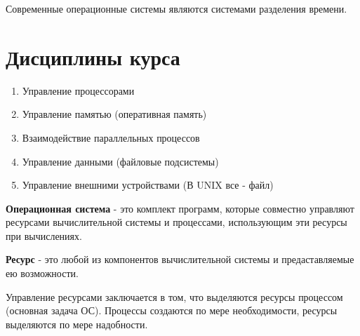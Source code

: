 \documentclass[a4paper, 14pt]{report}
\begin{document}
    Современные операционные системы являются системами разделения времени.

    \section{Дисциплины курса}

    \begin{enumerate}
        \item Управление процессорами
        \item Управление памятью (оперативная память)
        \item Взаимодействие параллельных процессов
        \item Управление данными (файловые подсистемы)
        \item Управление внешними устройствами (В UNIX все - файл)
    \end{enumerate}

    \textbf{Операционная система} - это комплект программ, которые совместно управляют ресурсами вычислительной системы и процессами, использующим эти ресурсы при вычислениях.

    \textbf{Ресурс} - это любой из компонентов вычислительной системы и предаставляемые ею возможности.

    Управление ресурсами заключается в том, что выделяются ресурсы процессом (основная задача ОС). Процессы создаются по мере необходимости, ресурсы выделяются по мере надобности.
\end{document}
